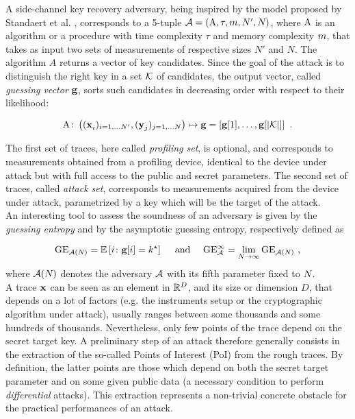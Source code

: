 A side-channel key recovery adversary, being inspired by the model proposed by Standaert et al. \cite{unifiedFramework}, corresponds to a 5-tuple  $\adversary = (\attackAlgorithm, \tau, \memComplexity , \numTraces[]', \numTraces[])$, where $\attackAlgorithm$ is an algorithm or a procedure with time complexity $\tau$ and memory complexity $\memComplexity$, that takes as input two sets of measurements of respective sizes $N'$ and $N$. The algorithm $A$ returns a vector of key candidates. Since the goal of the attack is to distinguish the right key in a set  $\keySet$  of candidates, the output vector, called {\em guessing vector} $\guessingVector$, sorts such candidates in decreasing order with respect to their likelihood:

\begin{equation}
\attackAlgorithm \colon \left( (\sss[]{i})_{i=1,\dots \numTraces[]'}, (\sssTest[]{j})_{j=1,\dots \numTraces[]} \right) \mapsto \guessingVector = \left[\guessingVector[1], \dots, \guessingVector[{\lvert \keySet \rvert}]\right] \mbox{ .}
\end{equation}


The first set of traces, here called {\em profiling set}, is optional, and corresponds to measurements obtained from a profiling device, identical to the device under attack but with full access to the public and secret parameters. The second set of traces,  called {\em attack set}, corresponds to measurements acquired from the device under attack, parametrized by a key which will be the target of the attack.\\

An interesting tool to assess the soundness of an adversary is given by the {\em guessing entropy} \cite{massey1994guessing} and by the {asymptotic guessing entropy}, respectively defined as

\begin{equation}
\guessingEntropy_{\adversary(\numTraces[])}  = \mathbb{E}\left[i \colon \guessingVector[i] = \keyTest \right] \quad \mbox{ and } \quad \guessingEntropy^\infty_\adversary  = \lim_{\numTraces[]\rightarrow \infty} \guessingEntropy_{\adversary(\numTraces[])} \mbox{ ,}
\end{equation}
where $\adversary(\numTraces[])$ denotes the adversary $\adversary$ with its fifth parameter fixed to $\numTraces[]$.\\

A trace $\sss[]{}$ can be seen as an element in $\mathbb{R}^\traceLength$, and its size or dimension $D$, that depends on a lot of factors (e.g. the instruments setup or the cryptographic algorithm under attack),  usually ranges between some thousands and some hundreds of thousands. Nevertheless, only few points of the trace depend on the secret target key. A preliminary step of an attack therefore generally consists in the extraction of the so-called {Points of Interest (PoI)} from the  rough traces. By definition, the latter points are those which depend on both the secret target parameter and on some given public data (a necessary condition to perform {\em differential} attacks). This extraction represents a non-trivial concrete obstacle for the practical performances of an attack.

